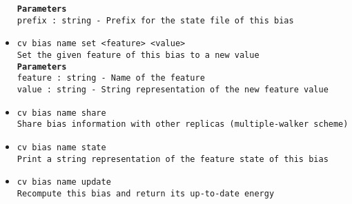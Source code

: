 \begin{itemize}
\texttt{\textbf{Parameters}}
\\
\texttt{prefix : string - Prefix for the state file of this bias}
\item \texttt{cv bias name set <feature> <value>}
\\
\texttt{Set the given feature of this bias to a new value}
\\
\texttt{\textbf{Parameters}}
\\
\texttt{feature : string - Name of the feature}
\\
\texttt{value : string - String representation of the new feature value}
\item \texttt{cv bias name share}
\\
\texttt{Share bias information with other replicas (multiple-walker scheme)}
\item \texttt{cv bias name state}
\\
\texttt{Print a string representation of the feature state of this bias}
\item \texttt{cv bias name update}
\\
\texttt{Recompute this bias and return its up-to-date energy}
\end{itemize}
